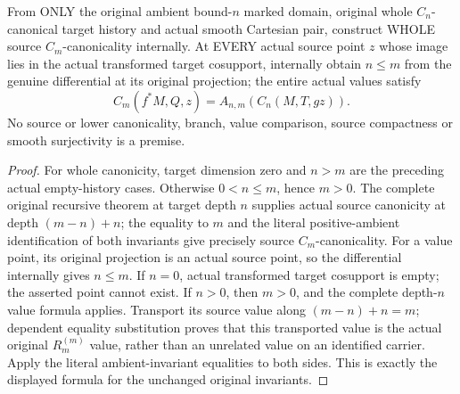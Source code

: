 \begin{theorem}
\label{hir:smooth-original-ambient-canonical-history-values}
\leanok
{}
From ONLY the original ambient bound-$n$ marked domain, original whole
$C_n$-canonical target history and actual smooth Cartesian pair, construct
WHOLE source $C_m$-canonicality internally. At EVERY actual source point $z$
whose image lies in the actual transformed target cosupport, internally
obtain $n\leq m$ from the genuine differential at its original projection;
the entire actual values satisfy
\[
 C_m(f^*M,Q,z)=A_{n,m}(C_n(M,T,gz)).
\]
No source or lower canonicality, branch, value comparison, source
compactness or smooth surjectivity is a premise.
\end{theorem}
\begin{proof}
For whole canonicity, target dimension zero and $n>m$ are the preceding
actual empty-history cases. Otherwise $0<n\leq m$, hence $m>0$.
The complete original recursive theorem at target depth $n$ supplies
actual source canonicity at depth $(m-n)+n$; the equality to $m$ and the
literal positive-ambient identification of both invariants give precisely
source $C_m$-canonicality. For a value point, its original projection is an
actual source point, so the differential internally gives $n\leq m$.
If $n=0$, actual transformed target cosupport is empty; the asserted point
cannot exist. If $n>0$, then $m>0$, and the complete depth-$n$ value formula
applies. Transport its source value along $(m-n)+n=m$; dependent equality
substitution proves that this transported value is the actual original
$R^{(m)}_m$ value, rather than an unrelated value on an identified carrier.
Apply the literal ambient-invariant equalities to both sides. This is exactly
the displayed formula for the unchanged original invariants.
\end{proof}

